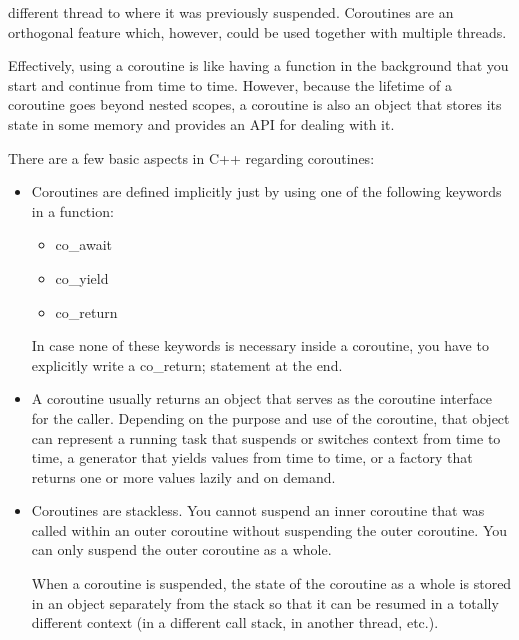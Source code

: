 different thread to where it was previously suspended. Coroutines are an orthogonal feature which, however, could be used together with multiple threads.

Effectively, using a coroutine is like having a function in the background that you start and continue from time to time. However, because the lifetime of a coroutine goes beyond nested scopes, a coroutine is also an object that stores its state in some memory and provides an API for dealing with it.

There are a few basic aspects in C++ regarding coroutines:

\begin{itemize}
\item 
Coroutines are defined implicitly just by using one of the following keywords in a function:

\begin{itemize}
\item 
co\_await

\item 
co\_yield

\item 
co\_return
\end{itemize}

In case none of these keywords is necessary inside a coroutine, you have to explicitly write a co\_return; statement at the end.

\item 
A coroutine usually returns an object that serves as the coroutine interface for the caller. Depending on the purpose and use of the coroutine, that object can represent a running task that suspends or switches context from time to time, a generator that yields values from time to time, or a factory that returns one or more values lazily and on demand.

\item 
Coroutines are stackless. You cannot suspend an inner coroutine that was called within an outer coroutine without suspending the outer coroutine. You can only suspend the outer coroutine as a whole.

When a coroutine is suspended, the state of the coroutine as a whole is stored in an object separately from the stack so that it can be resumed in a totally different context (in a different call stack, in another thread, etc.).
\end{itemize}












